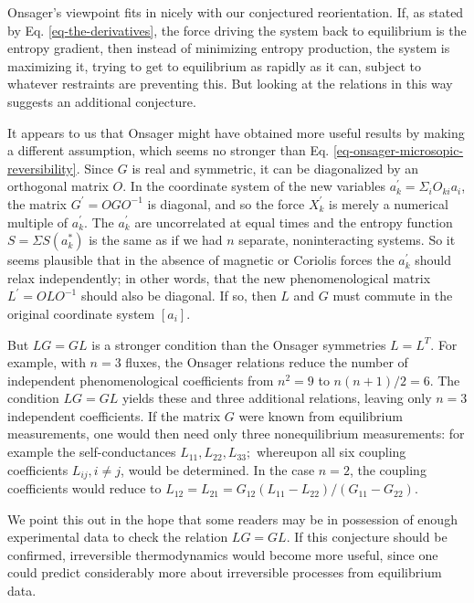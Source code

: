 \documentclass{article}
\begin{document}
Onsager's viewpoint fits in nicely with our conjectured reorientation. If, as stated by Eq. \ref{eq-the-derivatives}, the force driving the system back to equilibrium is the entropy gradient, then instead of minimizing entropy production, the system is maximizing it, trying to get to equilibrium as rapidly as it can, subject to whatever restraints are preventing this. But looking at the relations in this way suggests an additional conjecture.

It appears to us that Onsager might have obtained more useful results by making a different assumption, which seems no stronger than Eq. \ref{eq-onsager-microsopic-reversibility}. Since $G$ is real and symmetric, it can be diagonalized by an orthogonal matrix $O$. In the coordinate system of the new variables $a_k^{\prime}=\Sigma_i O_{k i} a_i$, the matrix $G^{\prime}=O G O^{-1}$ is diagonal, and so the force $X_k^{\prime}$ is merely a numerical multiple of $a_k^{\prime}$. The $a_k^{\prime}$ are uncorrelated at equal times and the entropy function $S=\Sigma S\left(a_k^*\right)$ is the same as if we had $n$ separate, noninteracting systems. So it seems plausible that in the absence of magnetic or Coriolis forces the $a_k^{\prime}$ should relax independently; in other words, that the new phenomenological matrix $L^{\prime}=O L O^{-1}$ should also be diagonal. If so, then $L$ and $G$ must commute in the original coordinate system $\left[a_i\right]$.

But $L G=G L$ is a stronger condition than the Onsager symmetries $L=L^T$. For example, with $n=3$ fluxes, the Onsager relations reduce the number of independent phenomenological coefficients from $n^2=9$ to $n(n+1) / 2=6$. The condition $L G=G L$ yields these and three additional relations, leaving only $n=3$ independent coefficients. If the matrix $G$ were known from equilibrium measurements, one would then need only three nonequilibrium measurements: for example the self-conductances $L_{11}, L_{22}, L_{33} ;$ whereupon all six coupling coefficients $L_{i j}, i \neq j$, would be determined. In the case $n=2$, the coupling coefficients would reduce to $L_{12}=L_{21}=G_{12}\left(L_{11}-L_{22}\right) /\left(G_{11}-G_{22}\right)$.

We point this out in the hope that some readers may be in possession of enough experimental data to check the relation $L G=G L$. If this conjecture should be confirmed, irreversible thermodynamics would become more useful, since one could predict considerably more about irreversible processes from equilibrium data.
\end{document}

